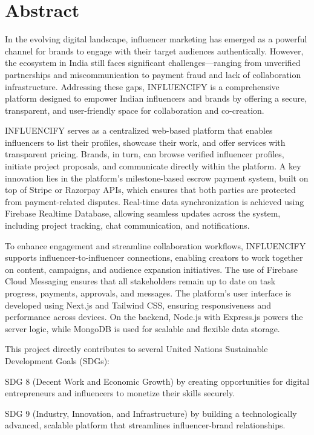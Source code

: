 
\chapter*{Abstract}
\begin{justify}
In the evolving digital landscape, influencer marketing has emerged as a powerful channel for brands to engage with their target audiences authentically. However, the ecosystem in India still faces significant challenges—ranging from unverified partnerships and miscommunication to payment fraud and lack of collaboration infrastructure. Addressing these gaps, INFLUENCIFY is a comprehensive platform designed to empower Indian influencers and brands by offering a secure, transparent, and user-friendly space for collaboration and co-creation.

INFLUENCIFY serves as a centralized web-based platform that enables influencers to list their profiles, showcase their work, and offer services with transparent pricing. Brands, in turn, can browse verified influencer profiles, initiate project proposals, and communicate directly within the platform. A key innovation lies in the platform’s milestone-based escrow payment system, built on top of Stripe or Razorpay APIs, which ensures that both parties are protected from payment-related disputes. Real-time data synchronization is achieved using Firebase Realtime Database, allowing seamless updates across the system, including project tracking, chat communication, and notifications.

To enhance engagement and streamline collaboration workflows, INFLUENCIFY supports influencer-to-influencer connections, enabling creators to work together on content, campaigns, and audience expansion initiatives. The use of Firebase Cloud Messaging ensures that all stakeholders remain up to date on task progress, payments, approvals, and messages. The platform’s user interface is developed using Next.js and Tailwind CSS, ensuring responsiveness and performance across devices. On the backend, Node.js with Express.js powers the server logic, while MongoDB is used for scalable and flexible data storage.

This project directly contributes to several United Nations Sustainable Development Goals (SDGs):

SDG 8 (Decent Work and Economic Growth) by creating opportunities for digital entrepreneurs and influencers to monetize their skills securely.

SDG 9 (Industry, Innovation, and Infrastructure) by building a technologically advanced, scalable platform that streamlines influencer-brand relationships.


\end{justify}

